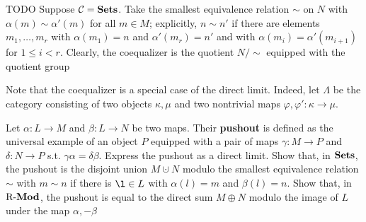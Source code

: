\documentclass[11pt]{article}
\begin{document}
 TODO \label{todo1}   Suppose \(\mathcal{C}=\operatorname{\textbf{Sets}}\). Take the smallest equivalence relation \(\sim\) on
\(N\) with \(\alpha(m)\sim\alpha'(m)\) for all \(m\in M\); explicitly, \(n\sim
   n'\) if there are elements \(m_1,\dots,m_r\) with \(\alpha(m_1)=n\) and
\(\alpha'(m_r)=n'\) and with \(\alpha(m_i)=\alpha'(m_{i+1})\) for \(1\le i<r\).
Clearly, the coequalizer is the quotient \(N/\sim\) equipped with the
quotient group

Note that the coequalizer is a special case of the direct limit. Indeed, let
\(\Lambda\) be the category consisting of two objects \(\kappa,\mu\) and two nontrivial maps
\(\varphi,\varphi':\kappa\to\mu\). 

\begin{exercise}
\label{6.9}
Let \(\alpha:L\to M\) and \(\beta:L\to N\) be two maps. Their \textbf{pushout} is defined as
the universal example of an object \(P\) equipped with a pair of maps
\(\gamma:M\to P\) and \(\delta:N\to P\) s.t. \(\gamma\alpha=\delta\beta\). Express the
pushout as a direct limit. Show that, in \(\operatorname{\textbf{Sets}}\), the pushout is the
disjoint union \(M\cupdot N\) modulo the smallest equivalence relation
\(\sim\) with \(m\sim n\) if there is \(\l\in L\) with \(\alpha(l)=m\) and
\(\beta(l)=n\). Show that, in \(\operatorname{R-\textbf{Mod}}\), the pushout is equal to the direct sum
\(M\oplus N\) modulo the image of \(L\) under the map \(\alpha,-\beta\)
\end{exercise}
\end{document}
